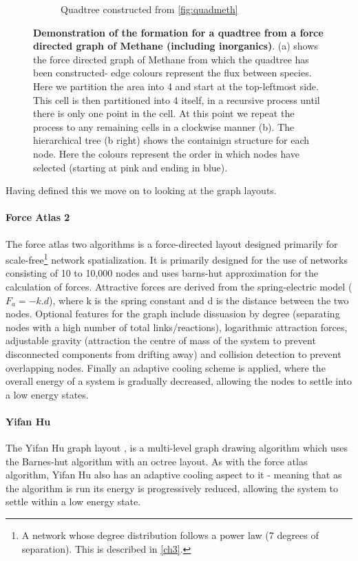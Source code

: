 \begin{figure}[H]
\begin{subfigure}[b]{.6\textwidth}
 \caption{Quadtree constructed from \autoref{fig:quadmeth}}
\label{fig:quadtree}
\end{subfigure}
\caption{ \textbf{Demonstration of the formation for a quadtree from a force directed graph of Methane (including inorganics)}. (a) shows the force directed graph of Methane from which the quadtree has been constructed- edge colours represent the flux between species. Here we partition the area into 4 and start at the top-leftmost side. This cell is then partitioned into 4 itself, in a recursive process until there is only one point in the cell. At this point we repeat the process to any remaining cells in a clockwise manner (b). The hierarchical tree (b right) shows the containign structure for each node. Here the colours represent the order in which nodes have selected (starting at pink and ending in blue). }
\label{fig:quadgroup}
\end{figure}

Having defined this we move on to looking at the graph layouts.

\paragraph{Force Atlas 2}
The force atlas two \citep{fa} algorithms is a force-directed layout designed primarily for scale-free\footnote{A network whose degree distribution follows a power law (7 degrees of separation). This is described in \autoref{ch3}.} network spatialization. It is primarily designed for the use of networks consisting of 10 to 10,000 nodes and uses barns-hut approximation for the calculation of forces. Attractive forces are derived from the spring-electric model ($F_a = -k.d$), where k is the spring constant and d is the distance between the two nodes. Optional features for the graph include dissuasion by degree (separating nodes with a high number of total links/reactions), logarithmic attraction forces, adjustable gravity (attraction the centre of mass of the system to prevent disconnected components from drifting away) and collision detection to prevent overlapping nodes. Finally an adaptive cooling scheme is applied, where the overall energy of a system is gradually decreased, allowing the nodes to settle into a low energy states.

\paragraph{Yifan Hu}
The Yifan Hu graph layout \citep{yh}, is a multi-level graph drawing algorithm which uses the Barnes-hut algorithm with an octree layout. As with the force atlas algorithm, Yifan Hu also has an adaptive cooling aspect to it - meaning that as the algorithm is run its energy is progressively reduced, allowing the system to settle within a low energy state.  

